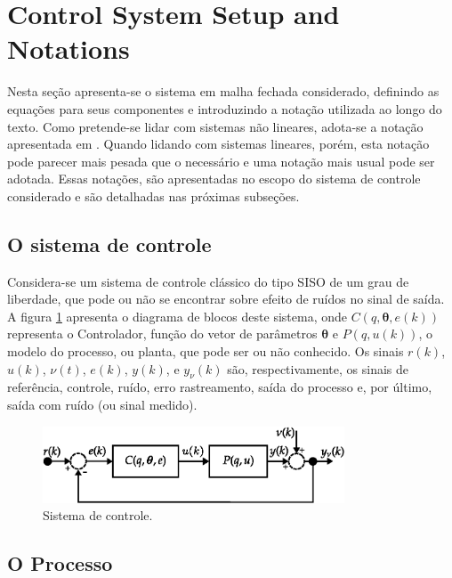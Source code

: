 \section{Control System Setup and Notations}%
\label{sec:system_setup_}

Nesta seção apresenta-se o sistema em malha fechada considerado, definindo as equações para seus componentes e introduzindo a notação utilizada ao longo do texto. Como pretende-se lidar com sistemas não lineares, adota-se a notação apresentada em \cite{campi2006}. Quando lidando com sistemas lineares, porém, esta notação pode parecer mais pesada que o necessário e uma notação mais usual pode ser adotada. Essas notações, são apresentadas no escopo do sistema de controle considerado e são detalhadas nas próximas subseções.

\subsection{O sistema de controle}%
\label{sub:o_sistema_de_controle}

Considera-se um sistema de controle clássico do tipo SISO de um grau de liberdade, que pode ou não se encontrar sobre efeito de ruídos no sinal de saída. A figura \ref{fig:diagrama_MF} apresenta o diagrama de blocos deste sistema, onde $C(q, \bm{\theta}, e(k))$ representa o Controlador, função do vetor de parâmetros $\bm{\theta}$ e $P(q,u(k))$, o modelo do processo, ou planta, que pode ser ou não conhecido. Os sinais $r(k)$,
$u(k)$, $\nu(t)$, $e(k)$, $y(k)$, e $y_\nu(k)$ são, respectivamente, os sinais de referência, controle, ruído, erro rastreamento, saída do processo e, por último, saída com ruído (ou sinal medido).

\begin{figure}[htpb] 
   \centering
   \includegraphics[width=0.8\textwidth]{Figs/diagrama_mf.eps}
   \caption{Sistema de controle.}
   \label{fig:diagrama_MF}
\end{figure}

\subsection{O Processo}%
\label{sub:o_processo}

